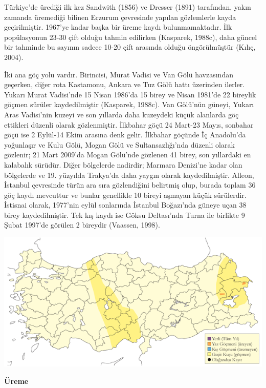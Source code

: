\documentclass[
  a4paper,
  DIV=11,
  numbers=noendperiod]{scrreprt}
\begin{document}
Türkiye'de ürediği ilk kez Sandwith (1856) ve Dresser (1891) tarafından,
yakın zamanda üremediği bilinen Erzurum çevresinde yapılan gözlemlerle
kayda geçirilmiştir. 1967'ye kadar başka bir üreme kaydı
bulunmamaktadır. İlk popülasyonun 23-30 çift olduğu tahmin edilirken
(Kasparek, 1988c), daha güncel bir tahminde bu sayının sadece 10-20 çift
arasında olduğu öngörülmüştür (Kılıç, 2004).

İki ana göç yolu vardır. Birincisi, Murat Vadisi ve Van Gölü havzasından
geçerken, diğer rota Kastamonu, Ankara ve Tuz Gölü hattı üzerinden
ilerler. Yukarı Murat Vadisi'nde 15 Nisan 1986'da 15 birey ve Nisan
1981'de 22 bireylik göçmen sürüler kaydedilmiştir (Kasparek, 1988c). Van
Gölü'nün güneyi, Yukarı Aras Vadisi'nin kuzeyi ve son yıllarda daha
kuzeydeki küçük alanlarda göç ettikleri düzenli olarak gözlenmiştir.
İlkbahar göçü 24 Mart-23 Mayıs, sonbahar göçü ise 2 Eylül-14 Ekim
arasına denk gelir. İlkbahar göçünde İç Anadolu'da yoğunlaşır ve Kulu
Gölü, Mogan Gölü ve Sultansazlığı'nda düzenli olarak gözlenir; 21 Mart
2009'da Mogan Gölü'nde gözlenen 41 birey, son yıllardaki en kalabalık
sürüdür. Diğer bölgelerde nadirdir; Marmara Denizi'ne kadar olan
bölgelerde ve 19. yüzyılda Trakya'da daha yaygın olarak kaydedilmiştir.
Alleon, İstanbul çevresinde türün ara sıra gözlendiğini belirtmiş olup,
burada toplam 36 göç kaydı mevcuttur ve bunlar genellikle 10 bireyi
aşmayan küçük sürülerdir. İstisnai olarak, 1977'nin eylül sonlarında
İstanbul Boğazı'nda güneye uçan 38 birey kaydedilmiştir. Tek kış kaydı
ise Göksu Deltası'nda Turna ile birlikte 9 Şubat 1997'de görülen 2
bireydir (Vaassen, 1998).

\includegraphics{images/harita_Page_125.png}

\textbf{Üreme}
\end{document}
